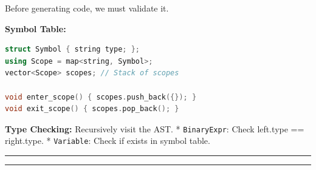 Before generating code, we must validate it.

\textbf{Symbol Table:}

\begin{lstlisting}[language={C++}]
struct Symbol { string type; };
using Scope = map<string, Symbol>;
vector<Scope> scopes; // Stack of scopes

void enter_scope() { scopes.push_back({}); }
void exit_scope() { scopes.pop_back(); }
\end{lstlisting}

\textbf{Type Checking:} Recursively visit the AST. *
\passthrough{\lstinline!BinaryExpr!}: Check left.type == right.type. *
\passthrough{\lstinline!Variable!}: Check if exists in symbol table.

\begin{center}\rule{0.5\linewidth}{0.5pt}\end{center}

\begin{center}\rule{0.5\linewidth}{0.5pt}\end{center}

